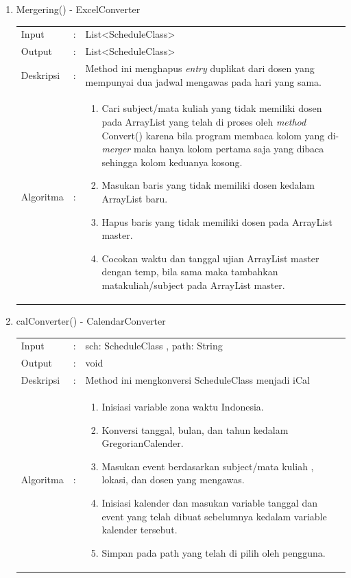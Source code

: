 \begin{enumerate}
	\item Mergering() - ExcelConverter\\
	\begin{tabular}{l c p{9cm}}
		Input & : & List<ScheduleClass> \\ 
		Output & : & List<ScheduleClass> \\ 
		Deskripsi & : & Method ini menghapus \textit{entry} duplikat dari dosen yang mempunyai dua jadwal mengawas pada hari yang sama.\\
		Algoritma & : & 
			\begin{enumerate}
				\item Cari subject/mata kuliah yang tidak memiliki dosen pada ArrayList yang telah di proses oleh \textit{method} Convert() karena bila program membaca kolom yang di-\textit{merger} maka hanya kolom pertama saja yang dibaca sehingga kolom keduanya kosong.
				\item Masukan baris yang tidak memiliki dosen kedalam ArrayList baru.
				\item Hapus baris yang tidak memiliki dosen pada ArrayList master.
				\item Cocokan waktu dan tanggal ujian ArrayList master dengan temp, bila sama maka tambahkan matakuliah/subject pada ArrayList master.
			\end{enumerate}
		\end{tabular}	
	
	\item calConverter() - CalendarConverter\\
	\begin{tabular}{l c p{9cm}}
		Input & : & sch: ScheduleClass , path: String\\ 
		Output & : & void \\ 
		Deskripsi & : & Method ini mengkonversi ScheduleClass menjadi iCal\\
		Algoritma & : & 
			\begin{enumerate}
				\item Inisiasi variable zona waktu Indonesia.
				\item Konversi tanggal, bulan, dan tahun kedalam GregorianCalender.
				\item Masukan event berdasarkan subject/mata kuliah , lokasi, dan dosen yang mengawas.
				\item Inisiasi kalender dan masukan variable tanggal dan event yang telah dibuat sebelumnya kedalam variable kalender tersebut.
				\item Simpan pada path yang telah di pilih oleh pengguna.
			\end{enumerate}
		\end{tabular}	
		

\end{enumerate}
